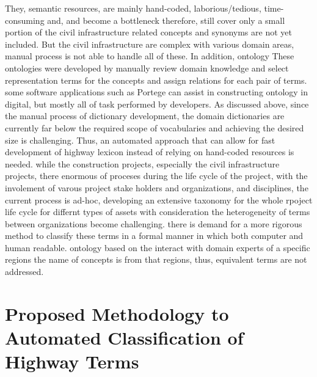 \documentclass[Journal,InsideFigs, DoubleSpace]{ascelike} %
\begin{document}
{They, semantic resources, are mainly hand-coded, laborious/tedious, time-consuming and, and become a bottleneck therefore, still cover only a small portion of the civil infrastructure related concepts and synonyms are not yet included. But the civil infrastructure are complex with various domain areas, manual process is not able to handle all of these. In addition, ontology These ontologies were developed by manually review domain knowledge and select representation terms for the concepts and assign relations for each pair of terms. some software applications such as Portege can assist in constructing ontology in digital, but mostly all of task performed by developers. As discussed above, since the manual process of dictionary development, the domain dictionaries are currently far below the required scope of vocabularies and achieving the desired size is challenging. Thus, an automated approach that can allow for fast development of highway lexicon instead of relying on hand-coded resources is needed. while the construction projects, especially the civil infrastructure projects, there enormous of proceses during the life cycle of the project, with the involement of varous project stake holders and organizations, and disciplines, the current process is ad-hoc, developing an extensive taxonomy for the whole rpoject life cycle for differnt types of assets with consideration the heterogeneity of terms between organizations become challenging. there is demand for a more rigorous method to classify these terms in a formal manner in which both computer and human readable. ontology based on the interact with domain experts of a specific regions the name of concepts is from that regions, thus, equivalent terms are not addressed. 
%
\section{Proposed Methodology to Automated Classification of Highway Terms} \label{sec:infralex}
}
\end{document}
